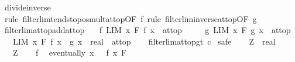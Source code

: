 \begin{isabellebody}
\ divide{\isacharunderscore}{\kern0pt}inverse\isanewline
\ \ \isamarkupfalse%
\ {\isacharparenleft}{\kern0pt}rule\ filterlim{\isacharunderscore}{\kern0pt}tendsto{\isacharunderscore}{\kern0pt}pos{\isacharunderscore}{\kern0pt}mult{\isacharunderscore}{\kern0pt}at{\isacharunderscore}{\kern0pt}top{\isacharbrackleft}{\kern0pt}OF\ f{\isacharbrackright}{\kern0pt}{\isacharparenright}{\kern0pt}\ {\isacharparenleft}{\kern0pt}rule\ filterlim{\isacharunderscore}{\kern0pt}inverse{\isacharunderscore}{\kern0pt}at{\isacharunderscore}{\kern0pt}top{\isacharbrackleft}{\kern0pt}OF\ g{\isacharbrackright}{\kern0pt}{\isacharparenright}{\kern0pt}%
\endisatagproof
{\isafoldproof}%
%
\isadelimproof
\isanewline
%
\endisadelimproof
\isanewline
{}\isamarkupfalse%
\ filterlim{\isacharunderscore}{\kern0pt}at{\isacharunderscore}{\kern0pt}top{\isacharunderscore}{\kern0pt}add{\isacharunderscore}{\kern0pt}at{\isacharunderscore}{\kern0pt}top{\isacharcolon}{\kern0pt}\isanewline
\ \ \ f{\isacharcolon}{\kern0pt}\ {\isachardoublequoteopen}LIM\ x\ F{\isachardot}{\kern0pt}\ f\ x\ {\isacharcolon}{\kern0pt}{\isachargreater}{\kern0pt}\ at{\isacharunderscore}{\kern0pt}top{\isachardoublequoteclose}\isanewline
\ \ \ \ \ g{\isacharcolon}{\kern0pt}\ {\isachardoublequoteopen}LIM\ x\ F{\isachardot}{\kern0pt}\ g\ x\ {\isacharcolon}{\kern0pt}{\isachargreater}{\kern0pt}\ at{\isacharunderscore}{\kern0pt}top{\isachardoublequoteclose}\isanewline
\ \ \ {\isachardoublequoteopen}LIM\ x\ F{\isachardot}{\kern0pt}\ {\isacharparenleft}{\kern0pt}f\ x\ {\isacharplus}{\kern0pt}\ g\ x\ {\isacharcolon}{\kern0pt}{\isacharcolon}{\kern0pt}\ real{\isacharparenright}{\kern0pt}\ {\isacharcolon}{\kern0pt}{\isachargreater}{\kern0pt}\ at{\isacharunderscore}{\kern0pt}top{\isachardoublequoteclose}\isanewline
%
\isadelimproof
\ \ %
\endisadelimproof
%
\isatagproof
{}\isamarkupfalse%
\ filterlim{\isacharunderscore}{\kern0pt}at{\isacharunderscore}{\kern0pt}top{\isacharunderscore}{\kern0pt}gt{\isacharbrackleft}{\kern0pt}\ c{\isacharequal}{\kern0pt}{}{\isacharbrackright}{\kern0pt}\isanewline
{}\isamarkupfalse%
\ safe\isanewline
\ \ \isamarkupfalse%
\ Z\ {\isacharcolon}{\kern0pt}{\isacharcolon}{\kern0pt}\ real\isanewline
\ \ \isamarkupfalse%
\ {\isachardoublequoteopen}{}\ {\isacharless}{\kern0pt}\ Z{\isachardoublequoteclose}\isanewline
\ \ \isamarkupfalse%
\ f\ \isamarkupfalse%
\ {\isachardoublequoteopen}eventually\ {\isacharparenleft}{\kern0pt}{\isasymlambda}x{\isachardot}{\kern0pt}\ {}\ {\isasymle}\ f\ x{\isacharparenright}{\kern0pt}\ F{\isachardoublequoteclose}\isanewline

\end{isabellebody}
